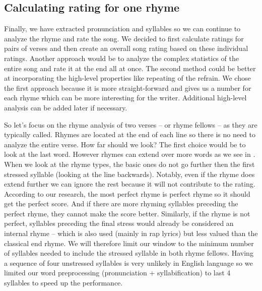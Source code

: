 \subsection{Calculating rating for one rhyme}
Finally, we have extracted pronunciation and syllables so we can continue to analyze the rhyme and rate the song. We decided to first calculate ratings for pairs of verses and then create an overall song rating based on these individual ratings. Another approach would be to analyze the complex statistics of the entire song and rate it at the end all at once. The second method could be better at incorporating the high-level properties like repeating of the refrain. We chose the first approach because it is more straight-forward and gives us a number for each rhyme which can be more interesting for the writer. Additional high-level analysis can be added later if necessary.

So let's focus on the rhyme analysis of two verses -- or rhyme fellows -- as they are typically called. Rhymes are located at the end of each line so there is no need to analyze the entire verse. How far should we look? The first choice would be to look at the last word. However rhymes can extend over more words as we see in . When we look at the rhyme types, the basic ones do not go further then the first stressed syllable (looking at the line backwards). Notably, even if the rhyme does extend further we can ignore the rest because it will not contribute to the rating. According to our research, the most perfect rhyme is perfect rhyme so it should get the perfect score. And if there are more rhyming syllables preceding the perfect rhyme, they cannot make the score better. Similarly, if the rhyme is not perfect, syllables preceding the final stress would already be considered an internal rhyme -- which is also used (mainly in rap lyrics) but less valued than the classical end rhyme. We will therefore limit our window to the minimum number of syllables needed to include the stressed syllable in both rhyme fellows. Having a sequence of four unstressed syllables is very unlikely in English language so we limited our word preprocessing (pronunciation + syllabification) to last 4 syllables to speed up the performance.


